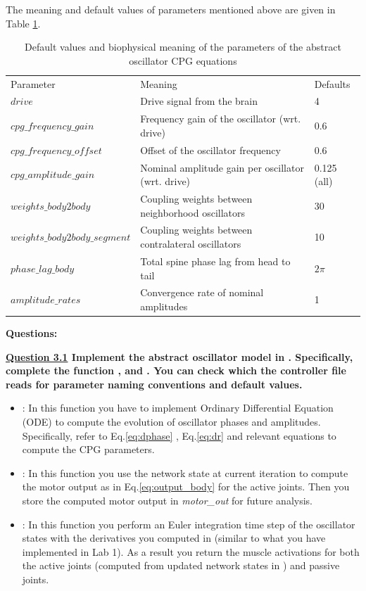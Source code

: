 \documentclass{cmc}
\begin{document}
The meaning and default values of parameters mentioned above are given in Table \ref{table_par_CPG}.

\begin{table}[!ht]
\centering
\begin{tabular}{ l l l }
 Parameter & Meaning & Defaults \\
 $drive$ & Drive signal from the brain & 4\\
 $cpg\_frequency\_gain$ & Frequency gain of the oscillator (wrt. drive) & 0.6\\
 $cpg\_frequency\_offset$ & Offset of the oscillator frequency & 0.6\\
 $cpg\_amplitude\_gain$ & Nominal amplitude gain per oscillator (wrt. drive) & 0.125 (all)\\
 $weights\_body2body$ & Coupling weights between neighborhood oscillators & 30\\
 $weights\_body2body\_segment$ & Coupling weights between contralateral oscillators & 10\\
 $phase\_lag\_body$ & Total spine phase lag from head to tail& $2\pi$\\
 $amplitude\_rates$ & Convergence rate of nominal amplitudes& 1
\end{tabular}
\caption{Default values and biophysical meaning of the parameters of the abstract oscillator CPG equations}
\label{table_par_CPG}
\end{table}
\textbf{Questions:}

\textbf{\underline{Question 3.1} Implement the abstract oscillator model in . Specifically, complete the function  ,  and .
    You can check  which the controller file reads for parameter naming conventions and default values.}
\begin{itemize}
        \item {}: In this function you have to implement Ordinary Differential Equation (ODE) to compute the evolution of oscillator phases and amplitudes. Specifically, refer to Eq.\ref{eq:dphase} , Eq.\ref{eq:dr} and relevant equations to compute the CPG parameters.
        \item {}: In this function you use the network state at current iteration to compute the motor output as in Eq.\ref{eq:output_body} for the active joints. Then you store the computed motor output in \textit{motor\_out} for future analysis.
        \item {}: In this function you perform an Euler integration time step of the oscillator states with the derivatives you computed in  (similar to what you have implemented in Lab 1). As a result you return the muscle activations for both the active joints (computed from updated network states in ) and passive joints.
    \end{itemize}
\end{document}

